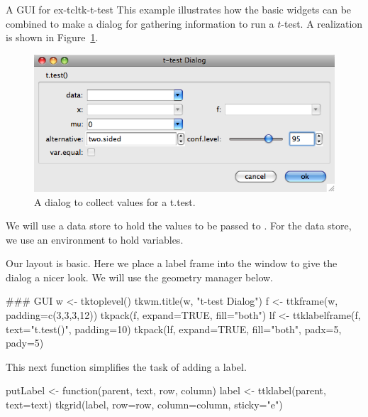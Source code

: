 \begin{example}{A GUI for }{ex-tcltk-t-test}
This example illustrates how the basic widgets can be combined to make
a dialog for gathering information to run a $t$-test. A realization is shown in Figure~\ref{fig:fig-tcltk-t-test}.

\begin{figure}
  \centering
  \includegraphics[width=.6\textwidth]{fig-tcltk-t-test.png}
  \caption{A dialog to collect values for a t.test.}
  \label{fig:fig-tcltk-t-test}
\end{figure}





We will use a data store to hold the values to be passed to
. For the data store, we  use an environment to hold \Tcl\/ variables.

\begin{Schunk}
\end{Schunk}

Our layout is basic. Here we place a label frame into the window to give the dialog a nicer look.
We will use the  geometry manager below.

\begin{Schunk}
\begin{Sinput}
 ### GUI
 w <- tktoplevel()
 tkwm.title(w, "t-test Dialog")
 f <- ttkframe(w, padding=c(3,3,3,12))
 tkpack(f, expand=TRUE, fill="both")
 lf <- ttklabelframe(f, text="t.test()", padding=10)
 tkpack(lf, expand=TRUE, fill="both", padx=5, pady=5)
\end{Sinput}
\end{Schunk}


This next function simplifies the task of adding a label.


\begin{Schunk}
\begin{Sinput}
 putLabel <- function(parent, text, row, column) {
   label <- ttklabel(parent, text=text)
   tkgrid(label, row=row, column=column, sticky="e")
 }
\end{Sinput}
\end{Schunk}


\end{example}
